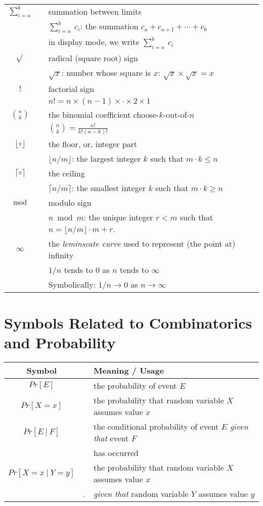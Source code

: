 \begin{tabular}{c|cl}
$\displaystyle \sum_{i=a}^b$
  & & summation between limits \\
  & & $\sum_{i=a}^b \ c_i$: the summation $c_a + c_{a+1} + \cdots + c_b$ \\
  & & in display mode, we write $\displaystyle \sum_{i=a}^b \ c_i$  \\ \hline
$\sqrt{}$
  & & radical (square root) sign \\
  & & $\sqrt{x}$: number whose square is $x$: $\sqrt{x} \times \sqrt{x} = x$ \\ \hline
$!$
  & & factorial sign \\
  & & $n! = n \times (n-1) \times \cdot \times 2 \times 1$ \\ \hline
$\displaystyle {n \choose k}$ 
  & & the binomial coefficient choose-$k$-out-of-$n$ \\
  & & $\displaystyle {n \choose k} = \frac{n!}{k! (n-k)!}$ \\ \hline
$\lfloor \circ \rfloor$
  & & the floor, or, integer part \\
  & & $\lfloor n/m \rfloor$: the largest integer $k$ such that $m \cdot k \leq n$ \\ \hline
$\lceil \circ \rceil$
  & & the ceiling \\
  & & $\lceil n/m \rceil$: the smallest integer $k$ such that $m \cdot k \geq n$ \\ \hline
$\bmod$
  & & modulo sign\\
  & & $n \bmod m$: the unique integer $r < m$ such that $n =  \lfloor n/m \rfloor \cdot m + r$. \\ \hline
$\infty$
  & & the {\it leminscate curve} used to represent (the point at) infinity \\
  & & $1/n$ tends to $0$ as $n$ tends to $\infty$ \\
  & & Symbolically: $1/n \rightarrow 0$ as $n \rightarrow \infty$ \\ \hline
\end{tabular}

\section*{Symbols Related to Combinatorics and Probability}

\begin{tabular}{c|cl}
{\bf Symbol} & & {\bf Meaning} / {\bf Usage} \\ \hline
\hline
$Pr[E]$
  & & the probability of event $E$ \\ \hline
$Pr[X=x]$
  & & the probability that random variable $X$ assumes value $x$ \\ \hline
$Pr[E \ | \ F]$
  &  & the conditional probability of event $E$ {\em given that} event $F$ \\
  &  & has occurred \\ \hline
$Pr[X=x \ | \ Y=y]$
  & & the probability that random variable $X$ assumes value $x$ \\
  &. & {\em given that} random variable $Y$ assumes value $y$ \\ \hline
\end{tabular}


